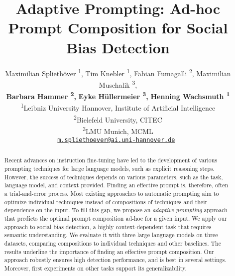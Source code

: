 
\title{Adaptive Prompting: Ad-hoc Prompt Composition for Social Bias Detection}

\author{
    Maximilian Spliethöver \textsuperscript{1},
    Tim Knebler \textsuperscript{1},
    Fabian Fumagalli \textsuperscript{2},
    Maximilian Muschalik \textsuperscript{3},
    \\
    \textbf{Barbara Hammer \textsuperscript{2},}
    \textbf{Eyke Hüllermeier \textsuperscript{3},}
    \textbf{Henning Wachsmuth \textsuperscript{1}}
    \\
    \textsuperscript{1}Leibniz University Hannover, Institute of Artificial Intelligence \\
    \textsuperscript{2}Bielefeld University, CITEC \\
    \textsuperscript{3}LMU Munich, MCML \\
    \tt \href{mailto:m.spliethoever@ai.uni-hannover.de}{m.spliethoever@ai.uni-hannover.de}
}


\maketitle

\begin{abstract}
Recent advances on instruction fine-tuning have led to the development of various prompting techniques for large language models, such as explicit reasoning steps.
However, the success of techniques depends on various parameters, such as the task, language model, and context provided. Finding an effective prompt is, therefore, often a trial-and-error process.
Most existing approaches to automatic prompting aim to optimize individual techniques instead of compositions of techniques and their dependence on the input.
To fill this gap, we propose an \emph{adaptive prompting} approach that predicts the optimal prompt composition ad-hoc for a given input.
We apply our approach to social bias detection, a highly context-dependent task that requires semantic understanding.
We evaluate it with three large language models on three datasets, comparing compositions to individual techniques and other baselines.
The results underline the importance of finding an effective prompt composition. Our approach robustly ensures high detection performance, and is best in several settings. Moreover, first experiments on other tasks support its generalizability.
\end{abstract}
